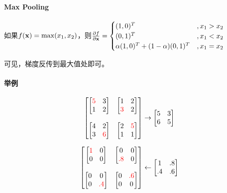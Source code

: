 \documentclass[12pt]{article}
\newcommand{\fpp}[2]{\frac{\partial #1}{\partial #2}}
\newcommand{\red}[1]{{\color{red}{#1}}}
\begin{document}
\paragraph{Max Pooling}

如果$f(\mathbf{x})=\max(x_1,x_2)$，则$\fpp{f}{\vx} = \begin{cases}
	(1,0)^T &, x_1 > x_2 \\
	(0,1)^T & ,x_1 < x_2 \\
	\alpha (1,0)^T + (1-\alpha) (0,1)^T &, x_1 = x_2
\end{cases}$

可见，梯度反传到最大值处即可。

\paragraph{举例}

\begin{equation}
	\begin{bmatrix}
		\begin{bmatrix}
			\red{5} & 3 \\
			1 & 2 
		\end{bmatrix} &
		\begin{bmatrix}
			1 & 2 \\
			\red{3} & 2 
		\end{bmatrix} \\ \\
		\begin{bmatrix}
			4 & 2 \\
			3 & \red{6} 
		\end{bmatrix} & 
		\begin{bmatrix}
			2 & \red{5} \\
			1 & 1 
		\end{bmatrix} 
	\end{bmatrix} \rightarrow 
	\begin{bmatrix}
		5 & 3 \\
		6 & 5 
	\end{bmatrix}
\end{equation}

\begin{equation}
	\begin{bmatrix}
		\begin{bmatrix}
			\red{1} & 0 \\
			0 & 0 
		\end{bmatrix} &
		\begin{bmatrix}
			0 & 0 \\
			\red{.8} & 0 
		\end{bmatrix} \\ \\
		\begin{bmatrix}
			0 & 0 \\
			0 & \red{.4} 
		\end{bmatrix} & 
		\begin{bmatrix}
			0 & \red{.6} \\
			0 & 0 
		\end{bmatrix} 
	\end{bmatrix} \leftarrow 
	\begin{bmatrix}
		1 & .8 \\
		.4 & .6 
	\end{bmatrix}
\end{equation}
\end{document}
